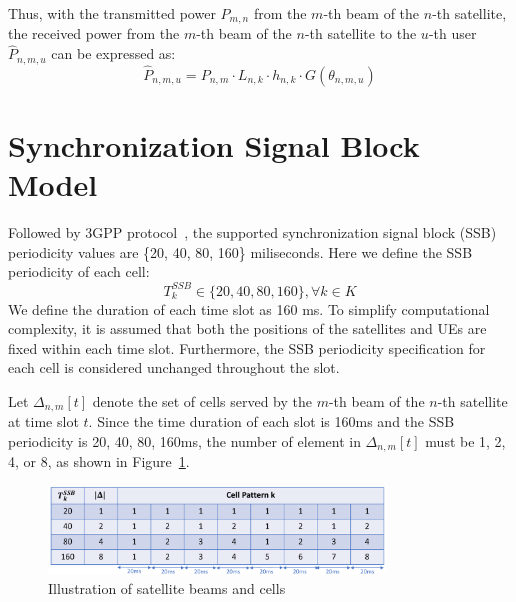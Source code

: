 Thus, with the transmitted power $P_{m,n}$ from the $m$-th beam of the $n$-th satellite, the received power from the $m$-th beam of the $n$-th satellite to the $u$-th user $\hat{P}_{n,m,u}$ can be expressed as:
\begin{equation}
    \hat{P}_{n,m,u} = P_{n,m} \cdot L_{n,k} \cdot h_{n,k} \cdot G(\theta_{n,m,u})%
\end{equation}

\section{Synchronization Signal Block Model}

Followed by 3GPP protocol~\cite{38331}, the supported synchronization signal block (SSB) periodicity values are \{20, 40, 80, 160\} miliseconds. Here we define the SSB periodicity of each cell:
\begin{equation}
    T^{SSB}_{k}\in\{20, 40, 80, 160\}, \forall k \in K
\end{equation}
We define the duration of each time slot as 160 ms. To simplify computational complexity, it is assumed that both the positions of the satellites and UEs are fixed within each time slot. Furthermore, the SSB periodicity specification for each cell is considered unchanged throughout the slot.

Let $\Delta_{n,m}[t]$ denote the set of cells served by the $m$-th beam of the $n$-th satellite at time slot $t$. Since the time duration of each slot is 160ms and the SSB periodicity is 20, 40, 80, 160ms, the number of element in $\Delta_{n,m}[t]$ must be 1, 2, 4, or 8, as shown in Figure~\ref{delta}.

\begin{figure}[h!]
    \centering
    \includegraphics[width=0.8\textwidth]{figure/delta pattern.pdf}
    \caption{Illustration of satellite beams and cells}
    \label{delta}
\end{figure}


